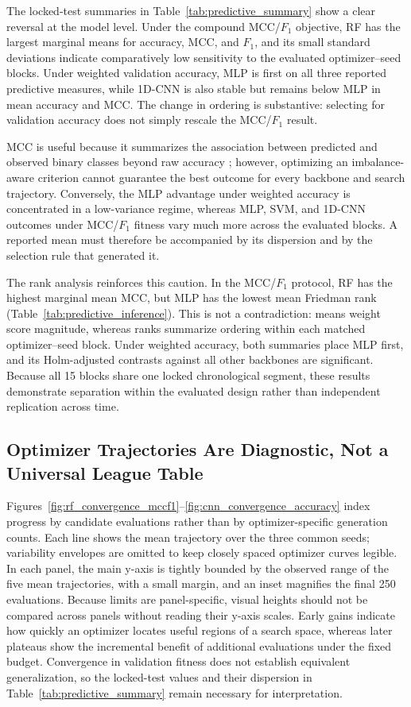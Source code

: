The locked-test summaries in Table~\ref{tab:predictive_summary} show a clear reversal at the model level. Under the compound MCC/$F_1$ objective, RF has the largest marginal means for accuracy, MCC, and $F_1$, and its small standard deviations indicate comparatively low sensitivity to the evaluated optimizer--seed blocks. Under weighted validation accuracy, MLP is first on all three reported predictive measures, while 1D-CNN is also stable but remains below MLP in mean accuracy and MCC. The change in ordering is substantive: selecting for validation accuracy does not simply rescale the MCC/$F_1$ result.

MCC is useful because it summarizes the association between predicted and observed binary classes beyond raw accuracy \cite{chicco2020mcc}; however, optimizing an imbalance-aware criterion cannot guarantee the best outcome for every backbone and search trajectory. Conversely, the MLP advantage under weighted accuracy is concentrated in a low-variance regime, whereas MLP, SVM, and 1D-CNN outcomes under MCC/$F_1$ fitness vary much more across the evaluated blocks. A reported mean must therefore be accompanied by its dispersion and by the selection rule that generated it.

The rank analysis reinforces this caution. In the MCC/$F_1$ protocol, RF has the highest marginal mean MCC, but MLP has the lowest mean Friedman rank (Table~\ref{tab:predictive_inference}). This is not a contradiction: means weight score magnitude, whereas ranks summarize ordering within each matched optimizer--seed block. Under weighted accuracy, both summaries place MLP first, and its Holm-adjusted contrasts against all other backbones are significant. Because all 15 blocks share one locked chronological segment, these results demonstrate separation within the evaluated design rather than independent replication across time.

\subsection{Optimizer Trajectories Are Diagnostic, Not a Universal League Table}

Figures~\ref{fig:rf_convergence_mccf1}--\ref{fig:cnn_convergence_accuracy} index progress by candidate evaluations rather than by optimizer-specific generation counts. Each line shows the mean trajectory over the three common seeds; variability envelopes are omitted to keep closely spaced optimizer curves legible. In each panel, the main y-axis is tightly bounded by the observed range of the five mean trajectories, with a small margin, and an inset magnifies the final 250 evaluations. Because limits are panel-specific, visual heights should not be compared across panels without reading their y-axis scales. Early gains indicate how quickly an optimizer locates useful regions of a search space, whereas later plateaus show the incremental benefit of additional evaluations under the fixed budget. Convergence in validation fitness does not establish equivalent generalization, so the locked-test values and their dispersion in Table~\ref{tab:predictive_summary} remain necessary for interpretation.

